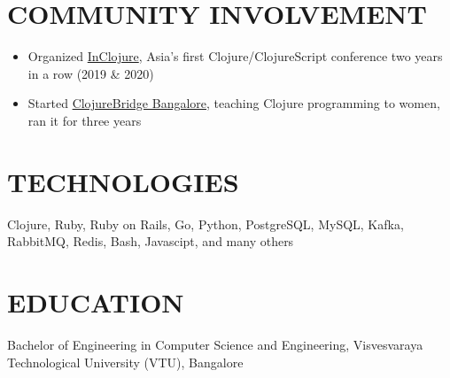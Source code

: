 \documentclass[11pt,a4paper]{article}
\begin{document}
\section*{COMMUNITY INVOLVEMENT}
\begin{itemize}
    \item Organized \href{https://inclojure.org}{InClojure}, Asia's first Clojure/ClojureScript conference two years in a row (2019 \& 2020)
    \item Started \href{https://tramline.app/clojurebridge}{ClojureBridge Bangalore}, teaching Clojure programming to women, ran it for three years
\end{itemize}

\section*{TECHNOLOGIES}
Clojure, Ruby, Ruby on Rails, Go, Python, PostgreSQL, MySQL, Kafka, RabbitMQ, Redis, Bash, Javascipt, and many others

\section*{EDUCATION}
Bachelor of Engineering in Computer Science and Engineering, Visvesvaraya Technological University (VTU), Bangalore
\end{document}
